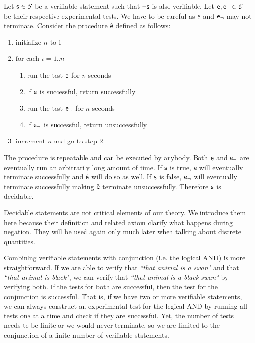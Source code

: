 \documentclass[11pt,letterpaper,fleqn]{memoir} %
\begin{document}
\begin{mathSection}
\begin{justification}
		Let $\mathsf{s} \in \mathcal{S}$ be a verifiable statement such that $\neg\mathsf{s}$ is also verifiable. Let $\mathsf{e}, \mathsf{e}_\neg \in \mathcal{E}$ be their respective experimental tests. We have to be careful as $\mathsf{e}$ and $\mathsf{e}_\neg$ may not terminate. Consider the procedure $\hat{\mathsf{e}}$ defined as follows:
		\begin{enumerate}
			\item initialize $n$ to 1
			\item for each $i=1..n$
			\begin{enumerate}
				\item run the test $\mathsf{e}$ for $n$ seconds
				\item if $\mathsf{e}$ is successful, return successfully
				\item run the test $\mathsf{e}_\neg$ for $n$ seconds
				\item if $\mathsf{e}_\neg$ is successful, return unsuccessfully
			\end{enumerate}
			\item increment $n$ and go to step 2
		\end{enumerate}
	    The procedure is repeatable and can be executed by anybody. Both $\mathsf{e}$ and $\mathsf{e}_\neg$ are eventually run an arbitrarily long amount of time. If $\mathsf{s}$ is true, $\mathsf{e}$ will eventually terminate successfully and $\hat{\mathsf{e}}$ will do so as well. If $\mathsf{s}$ is false, $\mathsf{e}_\neg$ will eventually terminate successfully making $\hat{\mathsf{e}}$ terminate unsuccessfully. Therefore $\mathsf{s}$ is decidable.
	\end{justification}

\end{mathSection}

Decidable statements are not critical elements of our theory. We introduce them here because their definition and related axiom clarify what happens during negation. They will be used again only much later when talking about discrete quantities.

Combining verifiable statements with conjunction (i.e. the logical AND) is more straightforward. If we are able to verify that \emph{``that animal is a swan"} and that \emph{``that animal is black"}, we can verify that \emph{``that animal is a black swan"} by verifying both. If the tests for both are successful, then the test for the conjunction is successful. That is, if we have two or more verifiable statements, we can always construct an experimental test for the logical AND by running all tests one at a time and check if they are successful. Yet, the number of tests needs to be finite or we would never terminate, so we are limited to the conjunction of a finite number of verifiable statements.
\end{document}
